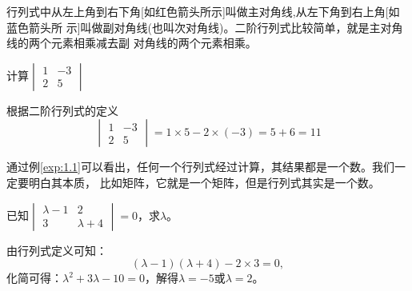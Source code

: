 行列式中从左上角到右下角[如红色箭头所示]叫做{\heiti 主对角线},从左下角到右上角[如蓝色箭头所
示]叫做{\heiti 副对角线}(也叫次对角线)。二阶行列式比较简单，就是主对角线的两个元素相乘减去副
对角线的两个元素相乘。

\vfill
\begin{example}\label{exp:1.1}
    计算$\begin{vmatrix}
        1 & -3\\
        2 & 5
    \end{vmatrix}$
\end{example}
\begin{solution}
    根据二阶行列式的定义
    \[\begin{vmatrix} 1 & -3\\ 2 & 5\end{vmatrix}=1\times 5-2\times(-3)=5+6=11\]
\end{solution}

通过例\ref{exp:1.1}可以看出，任何一个行列式经过计算，其结果都是一个数。我们一定要明白其本质，
比如矩阵，它就是一个矩阵，但是行列式其实是一个数。

\vfill
\begin{example}\label{exp:1.2}
    已知$\begin{vmatrix}
        \lambda-1 & 2\\
        3 & \lambda+4 
    \end{vmatrix}=0$，求$\lambda$。
\end{example}
\begin{solution}
    由行列式定义可知：
    \[(\lambda -1)(\lambda +4)-2\times 3=0,\]
    化简可得：$\lambda^2+3\lambda-10=0$，解得$\lambda=-5$或$\lambda=2$。
\end{solution}

